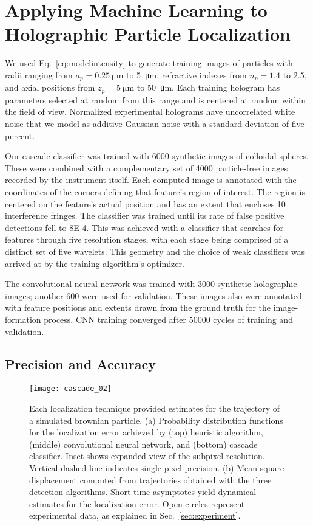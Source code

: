\section{Applying Machine Learning 
to Holographic Particle Localization}

We used Eq.~\eqref{eq:modelintensity} to generate training 
images of particles with radii ranging from 
$a_p = \SI{0.25}{\um}$ to \SI{5}{\um}, refractive indexes from 
$n_p = \num{1.4}$ to \num{2.5}, and axial positions from 
$z_p = \SI{5}{\um}$ to \SI{50}{\um}. 
Each training hologram has parameters selected at 
random from this 
range and is centered at random within
the field of view.
Normalized experimental holograms have uncorrelated white
noise that we model as additive Gaussian noise with a standard
deviation of five percent.

Our cascade classifier was trained with \num{6000}
synthetic images of colloidal spheres.
These were combined with a complementary set of 
\num{4000} particle-free images recorded by the instrument itself.
Each computed image is annotated with
the coordinates of the corners defining that feature's region of
interest.
The region is centered on the feature's actual position
and has an extent that encloses 10 interference fringes.
The classifier was trained
until its rate of false positive detections
fell to \num{8E-4}.
This was achieved with a classifier that searches for features
through five resolution stages, with each stage being
comprised of a distinct set of five wavelets.
This geometry and the choice of weak classifiers was arrived at
by the training algorithm's optimizer.

The convolutional neural network was trained with 
\num{3000} synthetic holographic images; another \num{600} 
were used for validation.
These images also were annotated with feature positions and extents
drawn from the ground truth for the image-formation process.
CNN training converged after \num{50000} cycles
of training and validation.

\subsection{Precision and Accuracy}
  
\begin{figure}[!t]
  \centering
  \texttt{[image: cascade\_02]} %
  \caption{Each localization technique provided estimates
  for the trajectory of a simulated brownian particle.
  (a) Probability distribution functions for the
  localization error achieved by (top) heuristic
  algorithm, (middle) convolutional neural network,
  and (bottom) cascade classifier. 
  Inset shows expanded view of the subpixel
  resolution. Vertical dashed line indicates single-pixel
  precision.
  (b) Mean-square displacement computed from 
  trajectories obtained with the three detection algorithms.
  Short-time asymptotes yield dynamical estimates
  for the localization error.
  Open circles represent experimental data,
  as explained in Sec.~\ref{sec:experiment}.
  }
  \label{fig:msdplot}
\end{figure}

